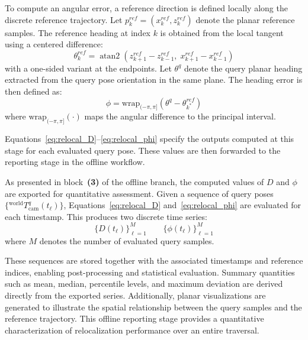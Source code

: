 \documentclass[a4paper,11pt]{article}
\begin{document}
To compute an angular error, a reference direction is defined locally along the discrete reference trajectory. Let $p^{ref}_{k}=(x^{ref}_{k},z^{ref}_{k})$ denote the planar reference samples. The reference heading at index $k$ is obtained from the local tangent using a centered difference:
\begin{equation}
	\theta^{ref}_{k}
	=
	\operatorname{atan2}\!\left(
	z^{ref}_{k+1}-z^{ref}_{k-1},\;
	x^{ref}_{k+1}-x^{ref}_{k-1}
	\right)
	\label{eq:relocal_ref_heading}
\end{equation}
with a one-sided variant at the endpoints. Let $\theta^{q}$ denote the query planar heading extracted from the query pose orientation in the same plane. The heading error is then defined as: 
\begin{equation}
	\phi
	=
	\mathrm{wrap}_{(-\pi,\pi]}\!\left(
	\theta^{q}
	-
	\theta^{ref}_{k^{*}}
	\right)
	\label{eq:relocal_phi}
\end{equation}
where $\mathrm{wrap}_{(-\pi,\pi]}(\cdot)$ maps the angular difference to the principal interval.

Equations~\eqref{eq:relocal_D}--\eqref{eq:relocal_phi} specify the outputs computed at this stage for each evaluated query pose. These values are then forwarded to the reporting stage in the offline workflow.

As presented in block~\textbf{(3)} of the offline branch, the computed values of $D$ and $\phi$ are exported for quantitative assessment. Given a sequence of query poses $\{{}^{\text{world}}\!T_{\text{cam}}^{q}(t_\ell)\}$, Equations~\eqref{eq:relocal_D} and~\eqref{eq:relocal_phi} are evaluated for each timestamp. This produces two discrete time series:
\begin{equation}
	\{ D(t_\ell) \}_{\ell=1}^{M}
	\qquad
	\{ \phi(t_\ell) \}_{\ell=1}^{M}
	\label{eq:relocal_timeseries}
\end{equation}
where $M$ denotes the number of evaluated query samples.

These sequences are stored together with the associated timestamps and reference indices, enabling post-processing and statistical evaluation. Summary quantities such as mean, median, percentile levels, and maximum deviation are derived directly from the exported series. Additionally, planar visualizations are generated to illustrate the spatial relationship between the query samples and the reference trajectory. This offline reporting stage provides a quantitative characterization of relocalization performance over an entire traversal. 
\end{document}
